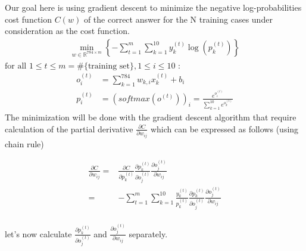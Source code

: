 \documentclass{article}
\begin{document}
\noindent Our goal here is  using gradient descent to  minimize  the negative  log-probabilities cost function $C(w)$ of the correct answer for the N training cases under consideration as the cost function. 
\begin{align*}
\underset{w \in \mathbb{R}^{784\times m}}{\min} \left\{
-\sum_{t=1}^{m}\sum_{k=1}^{10} y_{k}^{(t)}\log\left( p_{k}^{(t)}\right)
\right\}
\end{align*}
$ \text{for all } 1 \leq t  \leq m = \#\{\text{training set}\}, 1 \leq i  \leq 10$ :
\begin{align*}
o_i^{(t)} &= \sum_{k=1}^{784}w_{k,i}x_{k}^{(t)} + b_i \\
p^{(t)}_{i} &=(\textit{softmax}(o^{(t)}))_i = \frac{e^{o^{(t)}_{i}}}{\sum_{k=1}^{10}e^{o^{(t)}_{k}}}
\end{align*}
The minimization will be done with the gradient descent algorithm that require calculation of the partial derivative $\frac{\partial C}{\partial w_{ij}}$ which can be expressed as  follows (using chain rule)

\begin{align*}
\frac{\partial C}{\partial w_{ij}} =&\frac{\partial C}{\partial p^{(t)}_{k}}
\frac{\partial  p^{(t)}_{k}}{\partial o^{(t)}_{j}}
\frac{\partial  o^{(t)}_{j}}{\partial w_{ij}}\\
=&- \sum_{t=1}^{m}\sum_{k=1}^{10}
\frac{y^{(t)}_{k}}{ p^{(t)}_{k}}
\frac{\partial  p^{(t)}_{k}}{\partial o^{(t)}_{j}}
\frac{\partial  o^{(t)}_{j}}{\partial w_{ij}} \\
\end{align*}

let's now calculate $\frac{\partial  p^{(t)}_{k}}{\partial o^{(t)}_{j}}$ and
$\frac{\partial  o^{(t)}_{j}}{\partial w_{ij}}$ separately.
\end{document}
